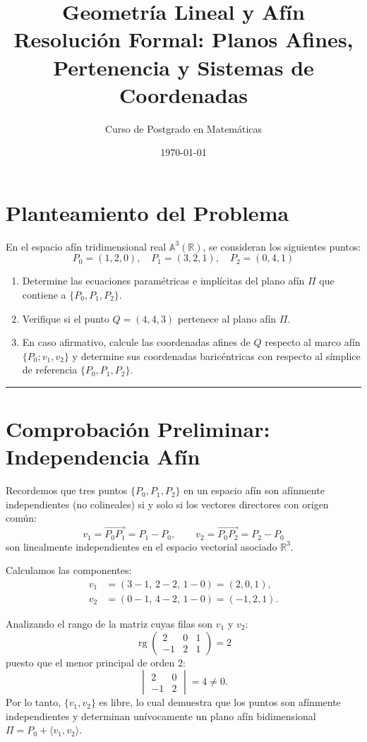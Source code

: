 \documentclass[11pt,a4paper]{article}
\title{\textbf{Geometría Lineal y Afín}\\ \large Resolución Formal: Planos Afines, Pertenencia y Sistemas de Coordenadas}
\author{Curso de Postgrado en Matemáticas}
\date{\today}
\begin{document}
\maketitle

\section*{Planteamiento del Problema}

En el espacio afín tridimensional real $\mathbb{A}^3(\mathbb{R})$, se consideran los siguientes puntos:
\[
P_0 = (1, 2, 0), \quad P_1 = (3, 2, 1), \quad P_2 = (0, 4, 1)
\]

\begin{enumerate}
    \item Determine las ecuaciones paramétricas e implícitas del plano afín $\Pi$ que contiene a $\{P_0, P_1, P_2\}$.
    \item Verifique si el punto $Q = (4, 4, 3)$ pertenece al plano afín $\Pi$.
    \item En caso afirmativo, calcule las coordenadas afines de $Q$ respecto al marco afín $\{P_0; v_1, v_2\}$ y determine sus coordenadas baricéntricas con respecto al símplice de referencia $\{P_0, P_1, P_2\}$.
\end{enumerate}

\hrule
\vspace{0.4cm}

\section{Comprobación Preliminar: Independencia Afín}

Recordemos que tres puntos $\{P_0, P_1, P_2\}$ en un espacio afín son afínmente independientes (no colineales) si y solo si los vectores directores con origen común:
\[
v_1 = \vec{P_0 P_1} = P_1 - P_0, \qquad v_2 = \vec{P_0 P_2} = P_2 - P_0
\]
son linealmente independientes en el espacio vectorial asociado $\mathbb{R}^3$.

Calculamos las componentes:
\begin{align*}
    v_1 &= (3 - 1,\, 2 - 2,\, 1 - 0) = (2, 0, 1), \\
    v_2 &= (0 - 1,\, 4 - 2,\, 1 - 0) = (-1, 2, 1).
\end{align*}

Analizando el rango de la matriz cuyas filas son $v_1$ y $v_2$:
\[
\operatorname{rg} \begin{pmatrix} 2 & 0 & 1 \\ -1 & 2 & 1 \end{pmatrix} = 2
\]
puesto que el menor principal de orden 2:
\[
\begin{vmatrix} 2 & 0 \\ -1 & 2 \end{vmatrix} = 4 \neq 0.
\]
Por lo tanto, $\{v_1, v_2\}$ es libre, lo cual demuestra que los puntos son afínmente independientes y determinan unívocamente un plano afín bidimensional $\Pi = P_0 + \langle v_1, v_2 \rangle$.
\end{document}
